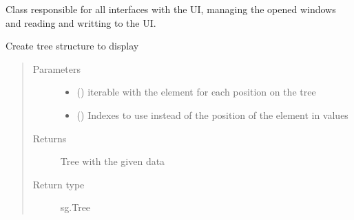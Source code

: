 \documentclass[letterpaper,10pt,english]{sphinxmanual}
\begin{document}
\begin{fulllineitems}
\label{\detokenize{interface:interface.Interface}}
\sphinxAtStartPar
Class responsible for all interfaces with the UI,
managing the opened windows and reading and writting
to the UI.

\begin{fulllineitems}
\label{\detokenize{interface:interface.Interface.create_tree}}
\sphinxAtStartPar
Create tree structure to display
\begin{quote}\begin{description}
\item[{Parameters}] \leavevmode\begin{itemize}
\item {} 
\sphinxAtStartPar
{} () \textendash{} iterable with the element for each position on the tree

\item {} 
\sphinxAtStartPar
{} (\sphinxstyleliteralemphasis{\sphinxupquote{, }}) \textendash{} Indexes to use instead of the position of the element in values

\end{itemize}

\item[{Returns}] \leavevmode
\sphinxAtStartPar
Tree with the given data

\item[{Return type}] \leavevmode
\sphinxAtStartPar
sg.Tree

\end{description}\end{quote}

\end{fulllineitems}



\end{fulllineitems}
\end{document}
